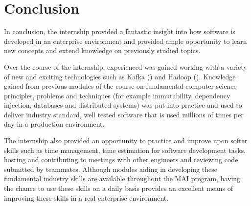 \chapter{Conclusion}
In conclusion, the internship provided a fantastic insight into how software is developed in an enterprise environment and provided ample opportunity to learn new concepts and extend knowledge on previously studied topics. 

Over the course of the internship, experienced was gained working with a variety of new and exciting technologies such as Kafka () and Hadoop (). Knowledge gained from previous modules of the course on fundamental computer science principles, problems and techniques (for example immutability, dependency injection, databases and distributed systems) was put into practice and used to deliver industry standard, well tested software that is used millions of times per day in a production environment.

The internship also provided an opportunity to practice and improve upon softer skills such as time management, time estimation for software development tasks, hosting and contributing to meetings with other engineers and reviewing code submitted by teammates. Although modules aiding in developing these fundamental industry skills are available throughout the MAI program, having the chance to use these skills on a daily basis provides an excellent means of improving these skills in a real enterprise environment.
